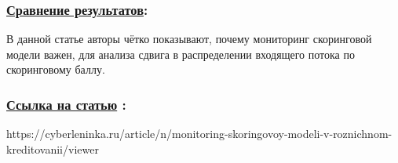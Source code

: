 \documentclass[a4paper,14pt]{article}
\begin{document}
\subsubsection*{\underline{Сравнение результатов}:}
В данной статье авторы чётко показывают, почему мониторинг скоринговой модели важен, для анализа сдвига в распределении входящего потока по скоринговому баллу.

\subsubsection*{\underline{Ссылка на статью} :}
https://cyberleninka.ru/article/n/monitoring-skoringovoy-modeli-v-roznichnom-kreditovanii/viewer
\end{document}
